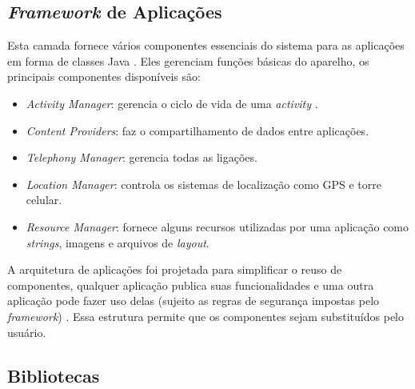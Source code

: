 \subsection{\textit{Framework} de Aplicações}
  Esta camada fornece vários componentes essenciais do sistema para as aplicações em forma de classes Java \cite{android1}. 
  Eles gerenciam funções básicas do aparelho, os principais componentes disponíveis são:
  \begin{itemize}
   \item \textit{Activity Manager}: gerencia o ciclo de vida de uma \textit{activity} \cite{activity}.
   \item \textit{Content Providers}: faz o compartilhamento de dados entre aplicações.
   \item \textit{Telephony Manager}: gerencia todas as ligações.
   \item \textit{Location Manager}: controla os sistemas de localização como GPS e torre celular.
   \item \textit{Resource Manager}: fornece alguns recursos utilizadas por uma aplicação como \textit{strings}, imagens e arquivos de \textit{layout}.
  \end{itemize}

   A arquitetura de aplicações foi projetada para simplificar o reuso de componentes, qualquer aplicação publica suas funcionalidades e uma
    outra aplicação pode fazer uso delas (sujeito as regras de segurança impostas pelo \textit{framework}) \cite{android0}. Essa estrutura permite que os componentes 
    sejam substituídos pelo usuário.
    
\subsection{Bibliotecas}


